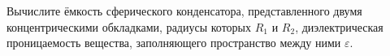 \documentclass[__main__.tex]{subfiles}
\begin{document}
Вычислите ёмкость сферического конденсатора, представленного двумя концентрическими обкладками, радиусы которых $R_1$ и $R_2$, диэлектрическая проницаемость вещества, заполняющего пространство между ними $\varepsilon$.\\ 

\end{document}
